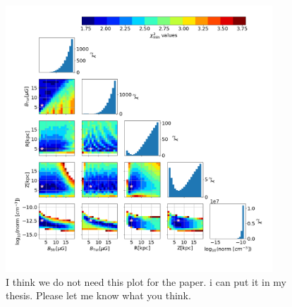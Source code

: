 \documentclass[12pt, a4 paper]{article}
\newcommand{\Vasu}[1]{{\color{purple}#1}}
\begin{document}
\begin{figure}[h!]
        \centering
        \includegraphics[width = 10cm]{Images/Jan20_Chsq_dof_Para_Scan_1_9_3_elec_den_norm_10GeV.png}
        \caption{\Vasu{I think we do not need this plot for the paper. i can put it in my thesis. Please let me know what you think.}}
        \label{fig:my_label}
\end{figure}


\newpage
\end{document}
